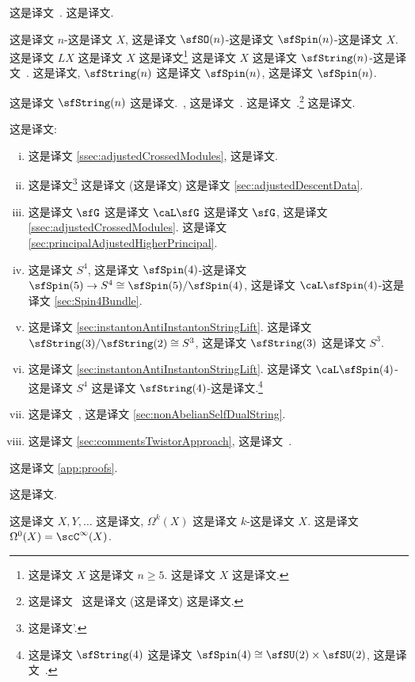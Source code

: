 \documentclass[
    affil-it, %
    auth-lg, %
    british, %
    compression, %
    contents, %
    custom-packages={}, %
    references={bigone}, %
]{lib/preprint}
\begin{document}
\begin{body}
 这是译文~\cite{Kim:2022opr}. 这是译文.
        
 这是译文 $n$-这是译文 $X$, 这是译文 $\sfSO(n)$-这是译文 $\sfSpin(n)$-这是译文 $X$. 这是译文 $LX$ 这是译文 $X$ 这是译文\footnote{这是译文 $X$ 这是译文 $n\geq5$. 这是译文 $X$ 这是译文.} 这是译文 $X$ 这是译文 $\sfString(n)$-这是译文~\cite{mclaughlin1992orientation}. 这是译文, $\sfString(n)$ 这是译文 $\sfSpin(n)$, 这是译文 $\sfSpin(n)$. 
        
 这是译文 $\sfString(n)$ 这是译文.~\cite{Nikolaus:2011zg}, 这是译文~\cite{Baez:2005sn}. 这是译文~\cite{Schommer-Pries:0911.2483}.\footnote{这是译文~\cite{Demessie:2016ieh} 这是译文 (这是译文) 这是译文.} 这是译文.
        
这是译文:
        \begin{enumerate}[(i)]\itemsep-2pt
            \item 这是译文 \cref{ssec:adjustedCrossedModules}, 这是译文.
            \item 这是译文\footnote{这是译文'.} 这是译文 (这是译文) 这是译文 \cref{sec:adjustedDescentData}.
            \item 这是译文 $\sfG$ 这是译文 $\caL\sfG$ 这是译文 $\sfG$, 这是译文 \cref{ssec:adjustedCrossedModules}. 这是译文 \cref{sec:principalAdjustedHigherPrincipal}.
            \item 这是译文 $S^4$, 这是译文 $\sfSpin(4)$-这是译文 $\sfSpin(5)\rightarrow S^4\cong\sfSpin(5)/\sfSpin(4)$, 这是译文 $\caL\sfSpin(4)$-这是译文 \cref{sec:Spin4Bundle}.
            \item 这是译文 \cref{sec:instantonAntiInstantonStringLift}. 这是译文 $\sfString(3)/\sfString(2)\cong S^3$, 这是译文 $\sfString(3)$ 这是译文 $S^3$.
            \item 这是译文 \cref{sec:instantonAntiInstantonStringLift}. 这是译文 $\caL\sfSpin(4)$-这是译文 $S^4$ 这是译文 $\sfString(4)$-这是译文.\footnote{这是译文 $\sfString(4)$ 这是译文 $\sfSpin(4)\cong\sfSU(2)\times\sfSU(2)$, 这是译文~\cite{Bagger:2007jr,Gustavsson:2007vu}.} 
            \item 这是译文~\cite{Saemann:2017rjm}, 这是译文 \cref{sec:nonAbelianSelfDualString}.
            \item 这是译文 \cref{sec:commentsTwistorApproach}, 这是译文~\cite{Saemann:2017rjm}.
        \end{enumerate}
这是译文 \cref{app:proofs}.
        
 这是译文.

        \begin{remark}
            这是译文 $X,Y,\ldots$ 这是译文, $\Omega^k(X)$ 这是译文 $k$-这是译文 $X$. 这是译文 $\Omega^0(X)=\scC^\infty(X)$. 
            

\end{remark}
\end{body}
\end{document}
